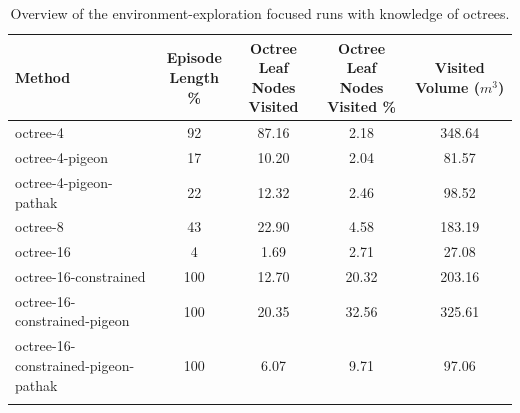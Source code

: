 \begin{longtable}{|l|c|c|c|c|}                            \hline
    \textbf{Method}            
    & \theadcentered{Episode \\ Length \%}          
    & \theadcentered{Octree Leaf \\ Nodes Visited} 
    & \theadcentered{Octree Leaf \\ Nodes Visited \%} 
    & \theadcentered{Visited  \\ Volume  ($m^3$)} 
    \\ \hline
  
    
    octree-4 & 92 & 87.16 & 2.18 & {\cellcolor[HTML]{55AA99}} \color[HTML]{000000} 348.64 \\ \hline
    octree-4-pigeon & 17 & 10.20 & 2.04 & {\cellcolor[HTML]{EBF2F0}} \color[HTML]{000000} 81.57 \\ \hline
    octree-4-pigeon-pathak & 22 & 12.32 & 2.46 & {\cellcolor[HTML]{EBF2F0}} \color[HTML]{000000} 98.52 \\ \hline
    octree-8 & 43 & 22.90 & 4.58 & {\cellcolor[HTML]{EBF2F0}} \color[HTML]{000000} 183.19 \\ \hline
    octree-16 & 4 & 1.69 & 2.71 & {\cellcolor[HTML]{EBF2F0}} \color[HTML]{000000} 27.08 \\ \hline
    octree-16-constrained & 100 & 12.70 & 20.32 & {\cellcolor[HTML]{DDEBE8}} \color[HTML]{000000} 203.16 \\ \hline
    octree-16-constrained-pigeon & 100 & 20.35 & 32.56 & {\cellcolor[HTML]{6AB4A5}} \color[HTML]{000000} 325.61 \\ \hline
    octree-16-constrained-pigeon-pathak & 100 & 6.07 & 9.71 & {\cellcolor[HTML]{EBF2F0}} \color[HTML]{000000} 97.06 \\ \hline
    
    \caption{Overview of the environment-exploration focused runs with knowledge of octrees. 
    }
    \label{tab:RQ2-results}
\end{longtable}


